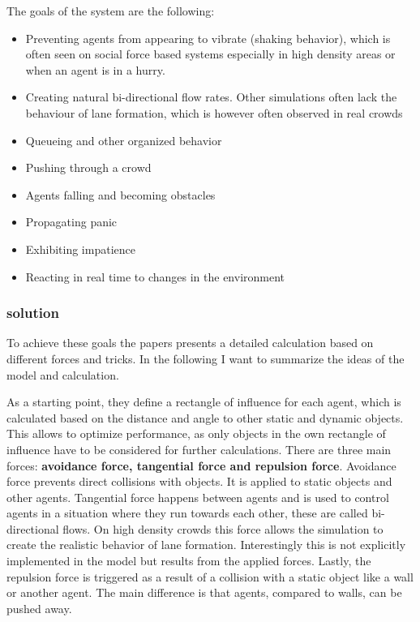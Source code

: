 \documentclass{acmsiggraph}               %
\begin{document}
The goals of the system are the following:
\begin{itemize}
    \item Preventing agents from appearing to vibrate (shaking behavior), which is often seen on social force based systems especially in high density areas or when an agent is in a hurry.
    \item Creating natural bi-directional flow rates. Other simulations often lack the behaviour of lane formation, which is however often observed in real crowds
    \item Queueing and other organized behavior
    \item Pushing through a crowd
    \item Agents falling and becoming obstacles 
    \item Propagating panic
    \item Exhibiting impatience
    \item Reacting in real time to changes in the environment
\end{itemize}

\subsubsection{solution}
To achieve these goals the papers presents a detailed calculation based on different forces and tricks. In the following I want to summarize the ideas of the model and calculation. 

As a starting point, they define a rectangle of influence for each agent, which is calculated based on the distance and angle to other static and dynamic objects. This allows to optimize performance, as only objects in the own rectangle of influence have to be considered for further calculations. 
There are three main forces: \textbf{avoidance force, tangential force and repulsion force}. Avoidance force prevents direct collisions with objects. It is applied to static objects and other agents. Tangential force happens between agents and is used to control agents in a situation where they run towards each other, these are called bi-directional flows. On high density crowds this force allows the simulation to create the realistic behavior of lane formation. Interestingly this is not explicitly implemented in the model but results from the applied forces. Lastly, the repulsion force is triggered as a result of a collision with a static object like a wall or another agent. The main difference is that agents, compared to walls, can be pushed away. 
\end{document}
